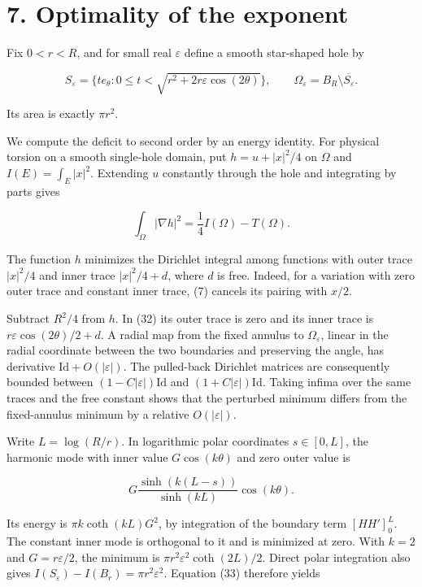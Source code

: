\documentclass[11pt]{article}
\begin{document}
\section{7. Optimality of the
exponent}\label{optimality-of-the-exponent}

Fix \(0<r<R\), and for small real \(\varepsilon\) define a smooth
star-shaped hole by

\[
S_\varepsilon=\{te_\theta:0\le t<\sqrt{r^2+2r\varepsilon\cos(2\theta)}\},
\qquad \Omega_\varepsilon=B_R\setminus\overline{S_\varepsilon}.
\tag{32}
\]

Its area is exactly \(\pi r^2\).

We compute the deficit to second order by an energy identity. For
physical torsion on a smooth single-hole domain, put \(h=u+|x|^2/4\) on
\(\Omega\) and \(I(E)=\int_E|x|^2\). Extending \(u\) constantly through
the hole and integrating by parts gives

\[
\int_\Omega|\nabla h|^2=\frac14I(\Omega)-T(\Omega).
\tag{33}
\]

The function \(h\) minimizes the Dirichlet integral among functions with
outer trace \(|x|^2/4\) and inner trace \(|x|^2/4+d\), where \(d\) is
free. Indeed, for a variation with zero outer trace and constant inner
trace, (7) cancels its pairing with \(x/2\).

Subtract \(R^2/4\) from \(h\). In (32) its outer trace is zero and its
inner trace is \(r\varepsilon\cos(2\theta)/2+d\). A radial map from the
fixed annulus to \(\Omega_\varepsilon\), linear in the radial coordinate
between the two boundaries and preserving the angle, has derivative
\(\mathrm{Id}+O(|\varepsilon|)\). The pulled-back Dirichlet matrices are
consequently bounded between \((1-C|\varepsilon|)\mathrm{Id}\) and
\((1+C|\varepsilon|)\mathrm{Id}\). Taking infima over the same traces
and the free constant shows that the perturbed minimum differs from the
fixed-annulus minimum by a relative \(O(|\varepsilon|)\).

Write \(L=\log(R/r)\). In logarithmic polar coordinates \(s\in[0,L]\),
the harmonic mode with inner value \(G\cos(k\theta)\) and zero outer
value is

\[
G\frac{\sinh(k(L-s))}{\sinh(kL)}\cos(k\theta).
\]

Its energy is \(\pi k\coth(kL)G^2\), by integration of the boundary term
\([HH']_0^L\). The constant inner mode is orthogonal to it and is
minimized at zero. With \(k=2\) and \(G=r\varepsilon/2\), the minimum is
\(\pi r^2\varepsilon^2\coth(2L)/2\). Direct polar integration also gives
\(I(S_\varepsilon)-I(B_r)=\pi r^2\varepsilon^2\). Equation (33)
therefore yields
\end{document}
